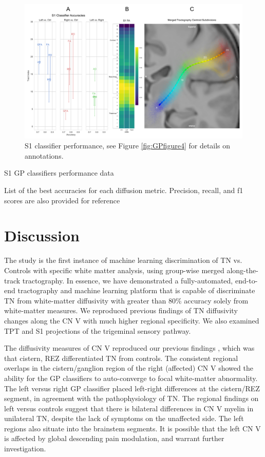 \begin{figure}[ht]
\centering
\includegraphics[width=\linewidth]{figure-GP-S1.pdf}
\caption{S1 classifier performance, see Figure \ref{fig:GPfigure4} for details on annotations.}
\label{fig:GPfigure5}
\end{figure}

\begin{table}[ht]
\centering
{}
\caption{S1 GP classifiers performance data}
\caption*{List of the best accuracies for each diffusion metric. Precision, recall, and f1 scores are also provided for reference}
\label{table:s1}
\end{table}

\section{Discussion}
The study is the first instance of machine learning discrimination of TN vs. Controls with specific white matter analysis, using group-wise merged along-the-track tractography. In essence, we have demonstrated a fully-automated, end-to-end tractography and machine learning platform that is capable of discriminate TN from white-matter diffusivity with greater than 80\% accuracy solely from white-matter measures. We reproduced previous findings of TN diffusivity changes along the CN V with much higher regional specificity. We also examined TPT and S1 projections of the trigeminal sensory pathway.

The diffusivity measures of CN V reproduced our previous findings \cite{Chen2016a}, which was that cistern, REZ differentiated TN from controls. The consistent regional overlaps in the cistern/ganglion region of the right (affected) CN V showed the ability for the GP classifiers to auto-converge to focal white-matter abnormality. The left versus right GP classifier placed left-right differences at the cistern/REZ segment, in agreement with the pathophysiology of TN. The regional findings on left versus controls suggest that there is bilateral differences in CN V myelin in unilateral TN, despite the lack of symptoms on the unaffected side. The left regions also situate into the brainstem segments. It is possible that the left CN V is affected by global descending pain modulation, and warrant further investigation. 


